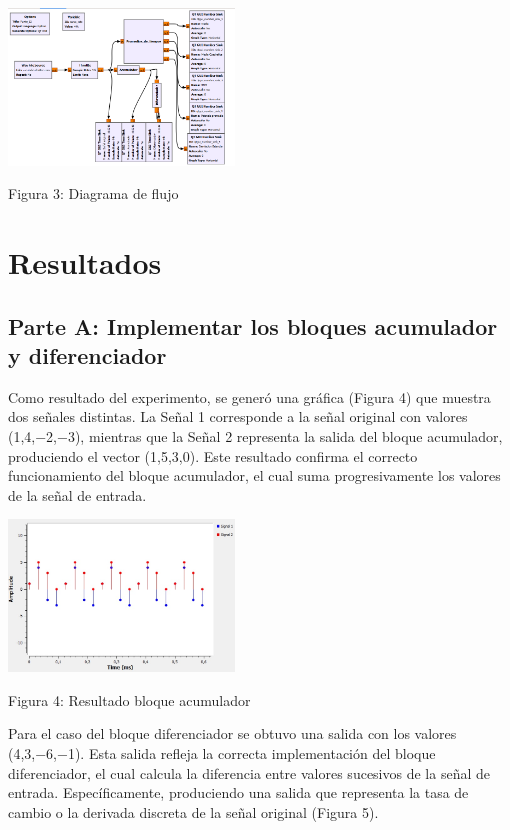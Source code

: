 \documentclass{journal}[IEEEtran, twocolumn]             %
\begin{document}
\begin{multicols}{2}
        \begin{center}
        \includegraphics[width=0.45\textwidth]{figs/F6.png}
        \caption{Figura 3: Diagrama de flujo}
        \end{center}
    
\section{Resultados}
\subsection{Parte A: Implementar los bloques acumulador y diferenciador}
Como resultado del experimento, se generó una gráfica (Figura 4) que muestra dos señales distintas. La Señal 1 corresponde a la señal original con valores (1,4,−2,−3), mientras que la Señal 2 representa la salida del bloque acumulador, produciendo el vector (1,5,3,0). Este resultado confirma el correcto funcionamiento del bloque acumulador, el cual suma progresivamente los valores de la señal de entrada.

    \begin{center}
    \includegraphics[width=0.45\textwidth]{figs/F2.png}
    \caption{Figura 4: Resultado bloque acumulador}
    \end{center}
    
    Para el caso del bloque diferenciador se obtuvo una salida con los valores (4,3,−6,−1). Esta salida refleja la correcta implementación del bloque diferenciador, el cual calcula la diferencia entre valores sucesivos de la señal de entrada. Específicamente, produciendo una salida que representa la tasa de cambio o la derivada discreta de la señal original (Figura 5).


\end{multicols}
\end{document}

